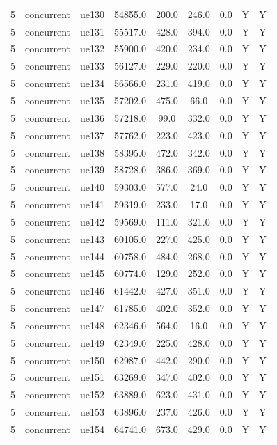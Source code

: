 \begin{table}[ht]
\begin{tabular}{|c|c|c|c|c|c|c|c|c|}
5 & concurrent & ue130 & 54855.0 & 200.0 & 246.0 & 0.0 & Y & Y \\
5 & concurrent & ue131 & 55517.0 & 428.0 & 394.0 & 0.0 & Y & Y \\
5 & concurrent & ue132 & 55900.0 & 420.0 & 234.0 & 0.0 & Y & Y \\
5 & concurrent & ue133 & 56127.0 & 229.0 & 220.0 & 0.0 & Y & Y \\
5 & concurrent & ue134 & 56566.0 & 231.0 & 419.0 & 0.0 & Y & Y \\
5 & concurrent & ue135 & 57202.0 & 475.0 & 66.0 & 0.0 & Y & Y \\
5 & concurrent & ue136 & 57218.0 & 99.0 & 332.0 & 0.0 & Y & Y \\
5 & concurrent & ue137 & 57762.0 & 223.0 & 423.0 & 0.0 & Y & Y \\
5 & concurrent & ue138 & 58395.0 & 472.0 & 342.0 & 0.0 & Y & Y \\
5 & concurrent & ue139 & 58728.0 & 386.0 & 369.0 & 0.0 & Y & Y \\
5 & concurrent & ue140 & 59303.0 & 577.0 & 24.0 & 0.0 & Y & Y \\
5 & concurrent & ue141 & 59319.0 & 233.0 & 17.0 & 0.0 & Y & Y \\
5 & concurrent & ue142 & 59569.0 & 111.0 & 321.0 & 0.0 & Y & Y \\
5 & concurrent & ue143 & 60105.0 & 227.0 & 425.0 & 0.0 & Y & Y \\
5 & concurrent & ue144 & 60758.0 & 484.0 & 268.0 & 0.0 & Y & Y \\
5 & concurrent & ue145 & 60774.0 & 129.0 & 252.0 & 0.0 & Y & Y \\
5 & concurrent & ue146 & 61442.0 & 427.0 & 351.0 & 0.0 & Y & Y \\
5 & concurrent & ue147 & 61785.0 & 402.0 & 352.0 & 0.0 & Y & Y \\
5 & concurrent & ue148 & 62346.0 & 564.0 & 16.0 & 0.0 & Y & Y \\
5 & concurrent & ue149 & 62349.0 & 225.0 & 428.0 & 0.0 & Y & Y \\
5 & concurrent & ue150 & 62987.0 & 442.0 & 290.0 & 0.0 & Y & Y \\
5 & concurrent & ue151 & 63269.0 & 347.0 & 402.0 & 0.0 & Y & Y \\
5 & concurrent & ue152 & 63889.0 & 623.0 & 431.0 & 0.0 & Y & Y \\
5 & concurrent & ue153 & 63896.0 & 237.0 & 426.0 & 0.0 & Y & Y \\
5 & concurrent & ue154 & 64741.0 & 673.0 & 429.0 & 0.0 & Y & Y \\

\end{tabular}
\end{table}
